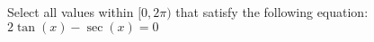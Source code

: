 \documentclass{ximera}
\author{David Kish}
\begin{document}
\begin{exercise}
Select all values within $[0,2\pi)$ that satisfy the following equation:\\
$2\tan(x) -\sec(x)=0$ \\
\begin{selectAll}
\choice{$\pi$}
\end{selectAll}
\end{exercise}
\end{document}
